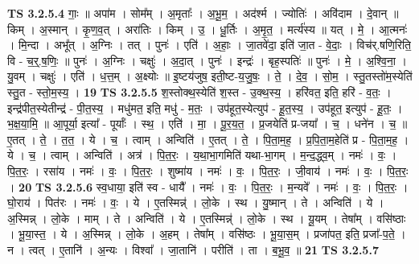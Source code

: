 \documentclass[17pt]{extarticle}
\begin{document}
                  \newline
                                \textbf{ TS 3.2.5.4} \newline
                  गाः॒ ॥ अपा॑म । सोम᳚म् । अ॒मृताः᳚ । अ॒भू॒म॒ । अद॑र्श्म । ज्योतिः॑ । अवि॑दाम । दे॒वान् ॥ किम् । अ॒स्मान् । कृ॒ण॒व॒त् । अरा॑तिः । किम् । उ॒ । धू॒र्तिः । अ॒मृ॒त॒ । मर्त्य॑स्य ॥ यत् । मे॒ । आ॒त्मनः॑ । मि॒न्दा । अभू᳚त् । अ॒ग्निः । तत् । पुनः॑ । एति॑ । अ॒हाः॒ । जा॒तवे॑दा॒ इति॑ जा॒त - वे॒दाः॒ । विच॑र्.षणि॒रिति॒ वि - च॒र्॒.ष॒णिः॒ ॥ पुनः॑ । अ॒ग्निः । चक्षुः॑ । अ॒दा॒त् । पुनः॑ । इन्द्रः॑ । बृह॒स्पतिः॑ ॥ पुनः॑ । मे॒ । अ॒श्वि॒ना॒ । यु॒वम् । चक्षुः॑ । एति॑ । ध॒त्त॒म् । अ॒क्ष्योः ॥ इ॒ष्टय॑जुष॒ इती॒ष्ट-य॒जु॒षः॒ । ते॒ । दे॒व॒ । सो॒म॒ । स्तु॒तस्तो॑म॒स्येति॑ स्तु॒त - स्तो॒म॒स्य॒ । \textbf{  19} \newline
                  \newline
                                \textbf{ TS 3.2.5.5} \newline
                  श॒स्तोक्थ॒स्येति॑ श॒स्त - उ॒क्थ॒स्य॒ । हरि॑वत॒ इति॒ हरि॑ - व॒तः॒ । इन्द्र॑पीत॒स्येतीन्द्र॑ - पी॒त॒स्य॒ । मधु॑मत॒ इति॒ मधु॑ - म॒तः॒ । उप॑हूत॒स्येत्युप॑ - हू॒त॒स्य॒ । उप॑हूत॒ इत्युप॑ - हू॒तः॒ । भ॒क्ष॒या॒मि॒ ॥ आ॒पूर्या॒ इत्या᳚ - पूर्याः᳚ । स्थ॒ । एति॑ । मा॒ । पू॒र॒य॒त॒ । प्र॒जयेति॑ प्र-जया᳚ । च॒ । धने॑न । च॒ ॥ ए॒तत् । ते॒ । त॒त॒ । ये । च॒ । त्वाम् । अन्विति॑ । ए॒तत् । ते॒ । पि॒ता॒म॒ह॒ । प्र॒पि॒ता॒म॒हेति॑ प्र - पि॒ता॒म॒ह॒ । ये । च॒ । त्वाम् । अन्विति॑ । अत्र॑ । पि॒त॒रः॒ । य॒था॒भा॒गमिति॑ यथा-भा॒गम् । म॒न्द॒द्ध्व॒म् । नमः॑ । वः॒ । पि॒त॒रः॒ । रसा॑य । नमः॑ । वः॒ । पि॒त॒रः॒ । शुष्मा॑य । नमः॑ । वः॒ । पि॒त॒रः॒ । जी॒वाय॑ । नमः॑ । वः॒ । पि॒त॒रः॒ । \textbf{  20} \newline
                  \newline
                                \textbf{ TS 3.2.5.6} \newline
                  स्व॒धाया॒ इति॑ स्व - धायै᳚ । नमः॑ । वः॒ । पि॒त॒रः॒ । म॒न्यवे᳚ । नमः॑ । वः॒ । पि॒त॒रः॒ । घो॒राय॑ । पित॑रः । नमः॑ । वः॒ । ये । ए॒तस्मिन्न्॑ । लो॒के । स्थ । यु॒ष्मान् । ते । अन्विति॑ । ये । अ॒स्मिन्न् । लो॒के । माम् । ते । अन्विति॑ । ये । ए॒तस्मिन्न्॑ । लो॒के । स्थ । यू॒यम् । तेषा᳚म् । वसि॑ष्ठाः । भू॒या॒स्त॒ । ये । अ॒स्मिन्न् । लो॒के । अ॒हम् । तेषा᳚म् । वसि॑ष्ठः । भू॒या॒स॒म् । प्रजा॑पत॒ इति॒ प्रजा᳚-प॒ते॒ । न । त्वत् । ए॒तानि॑ । अ॒न्यः । विश्वा᳚ । जा॒तानि॑ । परीति॑ । ता । ब॒भू॒व॒ ॥ \textbf{  21} \newline
                  \newline
                                \textbf{ TS 3.2.5.7} \newline
\end{document}

